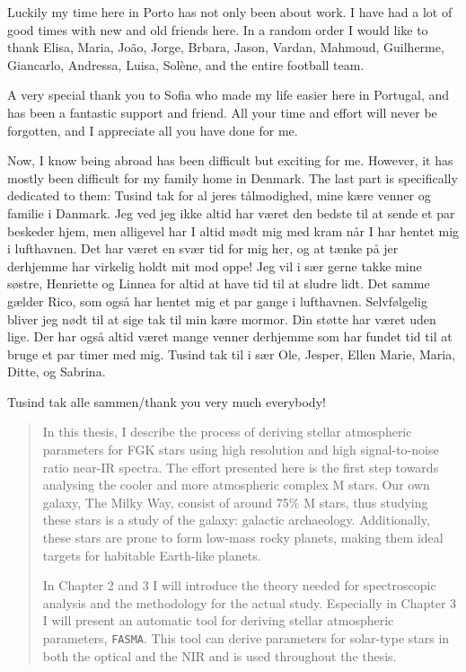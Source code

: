 \documentclass[fleqn]{fcup-thesis}
\newcommand{\code}[1]{\texttt{#1}}
\begin{document}
\begin{preliminary}
\begin{acknowledgements}
Luckily my time here in Porto has not only been about work. I have had a lot of good times with new
and old friends here. In a random order I would like to thank Elisa, Maria, Jo\~{a}o, Jorge,
Brbara, Jason, Vardan, Mahmoud, Guilherme, Giancarlo, Andressa, Luisa, Solène, and the entire
football team.

A very special thank you to Sofia who made my life easier here in Portugal, and has been a fantastic
support and friend. All your time and effort will never be forgotten, and I appreciate all you have
done for me.

Now, I know being abroad has been difficult but exciting for me. However, it has mostly been
difficult for my family home in Denmark. The last part is specifically dedicated to them: Tusind tak
for al jeres tålmodighed, mine kære venner og familie i Danmark. Jeg ved jeg ikke altid har været
den bedste til at sende et par beskeder hjem, men alligevel har I altid mødt mig med kram når I har
hentet mig i lufthavnen. Det har været en svær tid for mig her, og at tænke på jer derhjemme har
virkelig holdt mit mod oppe! Jeg vil i sær gerne takke mine søstre, Henriette og Linnea for altid at
have tid til at sludre lidt. Det samme gælder Rico, som også har hentet mig et par gange i
lufthavnen. Selvfølgelig bliver jeg nødt til at sige tak til min kære mormor. Din støtte har været
uden lige. Der har også altid været mange venner derhjemme som har fundet tid til at bruge et par
timer med mig. Tusind tak til i sær Ole, Jesper, Ellen Marie, Maria, Ditte, og Sabrina.

\vspace{7mm}
Tusind tak alle sammen/thank you very much everybody!


\end{acknowledgements}



\begin{abstract}

In this thesis, I describe the process of deriving stellar atmospheric parameters for FGK stars
using high resolution and high signal-to-noise ratio near-IR spectra. The effort presented here is
the first step towards analysing the cooler and more atmospheric complex M stars. Our own galaxy,
The Milky Way, consist of around 75\% M stars, thus studying these stars is a study of the galaxy:
galactic archaeology. Additionally, these stars are prone to form low-mass rocky planets, making
them ideal targets for habitable Earth-like planets.

In Chapter 2 and 3 I will introduce the theory needed for spectroscopic analysis and the methodology
for the actual study. Especially in Chapter 3 I will present an automatic tool for deriving stellar
atmospheric parameters, \code{FASMA}. This tool can derive parameters for solar-type stars in both
the optical and the NIR and is used throughout the thesis.


\end{abstract}
\end{preliminary}
\end{document}
